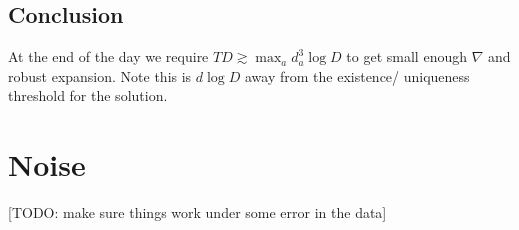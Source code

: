 \documentclass{article}
\newcommand\tr{\operatorname{Tr}}
\newcommand{\TODO}[1]{{\color{blue}[TODO: #1]}}
\begin{document}
\subsection{Conclusion}
At the end of the day we require $TD \gtrsim \max_{a} d_{a}^{3} \log D$ to get small enough $\nabla$ and robust expansion. Note this is $d \log D$ away from the existence/ uniqueness threshold for the solution. 

\section{Noise}
\TODO{make sure things work under some error in the data}











\end{document}
